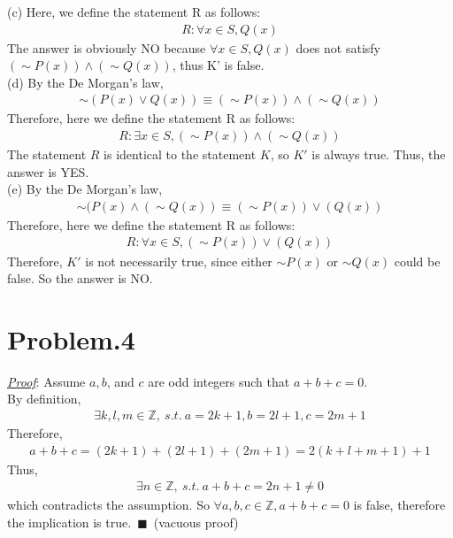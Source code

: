\documentclass[12pt]{article}
\begin{document}
(c)
Here, we define the statement R as follows:
\begin{gather*}
R: \forall  x \in S, Q(x)
\end{gather*}
The answer is obviously NO because $\forall  x \in S, Q(x)$ does not satisfy $(\sim P(x)) \land (\sim Q(x))$, thus K' is false.\\[1em]
(d) By the De Morgan's law,
\begin{gather*}
\sim (P(x) \lor Q(x)) \equiv (\sim P(x)) \land (\sim Q(x))
\end{gather*}
Therefore, here we define the statement R as follows:
\begin{gather*}
R: \exists  x \in S, (\sim P(x)) \land (\sim Q(x))
\end{gather*}
The statement $R$ is identical to the statement $K$, so $K'$ is always true.
Thus, the answer is YES.\\[1em]
(e) By the De Morgan's law,
\begin{gather*}
\sim (P(x) \land (\sim Q(x)) \equiv (\sim P(x)) \lor (Q(x))
\end{gather*}
Therefore, here we define the statement R as follows:
\begin{gather*}
R: \forall  x \in S, (\sim P(x)) \lor (Q(x))
\end{gather*}
Therefore, $K'$ is not necessarily true, since either $\sim P(x)$ or $\sim Q(x)$ could be false. So the answer is NO.\\[1em]
\section*{Problem.4}
\underline{\textit{Proof}}: Assume $a,b$, and $c$ are odd integers such that $a + b + c = 0$.\\
By definition,
\begin{gather*}
\exists k,l,m \in \mathbb{Z}, ~s.t.~a = 2k+1, b= 2l+1, c= 2m+1
\end{gather*}
Therefore,
\begin{gather*}
a + b + c = (2k+1) + (2l+1) + (2m+1) = 2(k+l+m+1) + 1 
\end{gather*}
Thus,
\begin{gather*}
\exists n \in \mathbb{Z},~s.t.~a + b + c = 2n + 1 \neq 0
\end{gather*}
which contradicts the assumption. So $\forall a,b,c \in \mathbb{Z},a+b+c=0$ is false, therefore the implication is true.~$\blacksquare$~(vacuous proof)
\end{document}
